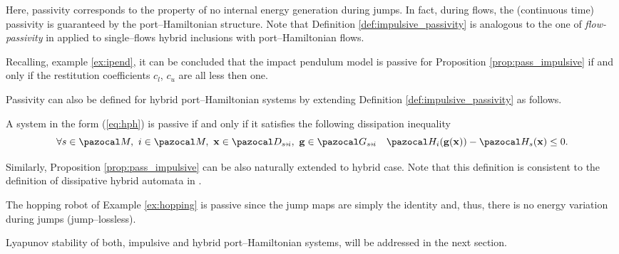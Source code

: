 %
Here, passivity corresponds to the property of no internal energy generation during jumps. In fact, during flows, the (continuous time) passivity is guaranteed by the port--Hamiltonian structure.
Note that Definition \ref{def:impulsive_passivity} is analogous to the one of \textit{flow-passivity} in \cite{naldi2013passivity} applied to single--flows hybrid inclusions with port--Hamiltonian flows. 
%
\begin{rem}
    Recalling, example \ref{ex:ipend}, it can be concluded that the impact pendulum model is passive for Proposition \ref{prop:pass_impulsive} if and only if the restitution coefficients $c_l$, $c_u$ are all less then one.
\end{rem}
%
Passivity can also be defined for hybrid port--Hamiltonian systems by extending Definition \ref{def:impulsive_passivity} as follows.
%
\begin{defn} \label{def:hybrid_passivity}
    A system in the form (\ref{eq:hph}) is passive if and only if it satisfies the following dissipation inequality
    \begin{equation}
        \forall s\in\M,~i\in\M,~\xb\in\D_{s\Arrow{0.1cm}i},~\mathbf{g}\in\G_{s\Arrow{0.1cm}i} \quad \Ha_i(\mathbf{g}(\xb))-\Ha_s(\xb)\leq 0.
    \end{equation}
\end{defn}
%
Similarly, Proposition \ref{prop:pass_impulsive} can be also naturally extended to hybrid case. Note that this definition is consistent to the definition of dissipative hybrid automata in \citep{agarwal2017}. 
%
%	
%
\begin{rem}
The hopping robot of Example \ref{ex:hopping} is passive since the jump maps are simply the identity and, thus, there is no energy variation during jumps (jump--lossless). 
\end{rem}
%
Lyapunov stability of both, impulsive and hybrid port--Hamiltonian systems, will be addressed in the next section.
%
\clearpage
